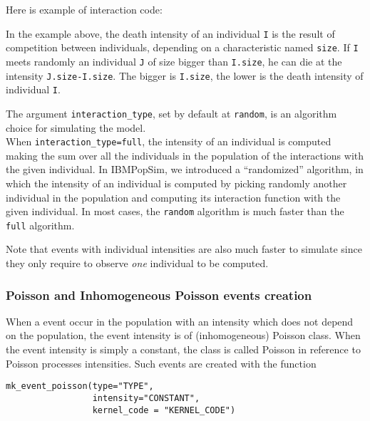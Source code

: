 Here is example of interaction code:

\begin{Shaded}
\begin{Highlighting}[]
\end{Highlighting}
\end{Shaded}

In the example above, the death intensity of an individual \texttt{I} is the result of competition between individuals, depending on a characteristic named \texttt{size}. If \texttt{I} meets randomly an individual \texttt{J} of size bigger than \texttt{I.size}, he can die at the intensity \texttt{J.size-I.size}. The bigger is \texttt{I.size}, the lower is the death intensity of individual \texttt{I}.

The argument \texttt{interaction\_type}, set by default at \texttt{random}, is an algorithm choice for simulating the model.\\
When \texttt{interaction\_type=full}, the intensity of an individual is computed making the sum over all the individuals in the population of the interactions with the given individual. In IBMPopSim, we introduced a ``randomized'' algorithm, in which the intensity of an individual is computed by picking randomly another individual in the population and computing its interaction function with the given individual. In most cases, the \texttt{random} algorithm is much faster than the \texttt{full} algorithm.

Note that events with individual intensities are also much faster to simulate since they only require to observe \emph{one} individual to be computed.

\hypertarget{poisson-and-inhomogeneous-poisson-events-creation}{%
\subsubsection{Poisson and Inhomogeneous Poisson events creation}\label{poisson-and-inhomogeneous-poisson-events-creation}}

When a event occur in the population with an intensity which does not depend on the population, the event intensity is of (inhomogeneous) Poisson class. When the event intensity is simply a constant, the class is called Poisson in reference to Poisson processes intensities. Such events are created with the function

\begin{verbatim}
mk_event_poisson(type="TYPE",   
                 intensity="CONSTANT",   
                 kernel_code = "KERNEL_CODE")
\end{verbatim}


